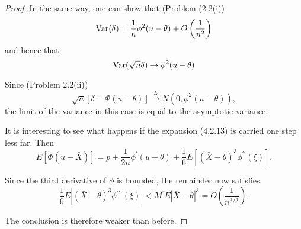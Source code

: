\begin{proof}
	In the same way, one can show that (Problem (2.2(i))
	\begin{equation*}
		\mathrm{Var}(\delta)=\frac{1}{n} \phi^2(u-\theta)+O\left(\frac{1}{n^2}\right)
	\end{equation*}
	and hence that
	\begin{equation*}
		\mathrm{Var}(\sqrt{n} \delta) \rightarrow \phi^2(u-\theta)
	\end{equation*}

	Since (Problem 2.2(ii))
	\begin{equation*}
		\sqrt{n}[\delta-\Phi(u-\theta)] \xrightarrow{L} N\left(0, \phi^2(u-\theta)\right),
	\end{equation*}
	the limit of the variance in this case is equal to the asymptotic variance.

	It is interesting to see what happens if the expansion (4.2.13) is carried one step less far. Then
	\begin{equation*}
		E[\Phi(u-\bar{X})]=p+\frac{1}{2 n} \phi^{\prime}(u-\theta)+\frac{1}{6} E\left[(\bar{X}-\theta)^3 \phi^{\prime \prime}(\xi)\right] .
	\end{equation*}

	Since the third derivative of $\phi$ is bounded, the remainder now satisfies
	\begin{equation*}
		\frac{1}{6} E\left|(\bar{X}-\theta)^3 \phi^{\prime \prime \prime}(\xi)\right|<M^{\prime} E|\bar{X}-\theta|^3=O\left(\frac{1}{n^{3 / 2}}\right) .
	\end{equation*}

	The conclusion is therefore weaker than before.
\end{proof}
